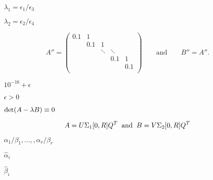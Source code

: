{\newpage\clearpage
{}%
$\lambda_1 = \epsilon_1 / \epsilon_3$%
\lthtmlinlinemathZ
\lthtmlcheckvsize\clearpage}

{\newpage\clearpage
{}%
$\lambda_2 = \epsilon_2 / \epsilon_4$%
\lthtmlinlinemathZ
\lthtmlcheckvsize\clearpage}

{\newpage\clearpage
{}%
\begin{displaymath}
A'' = \left( \begin{array}{ccccc}
           0.1 & 1   &        &        &     \\
               & 0.1 & 1      &        &     \\
               &     & \ddots & \ddots &      \\
               &     &        & 0.1    &  1   \\
               &     &        &        & 0.1   \\
           \end{array} \right) \quad\quad
\mbox{and} \quad\quad B'' = A''.
\end{displaymath}%
\lthtmldisplayZ
\lthtmlcheckvsize\clearpage}

{\newpage\clearpage
{}%
$10^{-16} + \epsilon$%
\lthtmlinlinemathZ
\lthtmlcheckvsize\clearpage}

{\newpage\clearpage
{}%
$\epsilon>0$%
\lthtmlinlinemathZ
\lthtmlcheckvsize\clearpage}

{\newpage\clearpage
{}%
${\rm det}(A- \lambda B) \equiv 0$%
\lthtmlinlinemathZ
\lthtmlcheckvsize\clearpage}

{\newpage\clearpage
{}%
\begin{displaymath}
A = U \Sigma_1 [0,R] Q^T \; \; {\rm and} \; \;
B = V \Sigma_2 [0,R] Q^T
\end{displaymath}%
\lthtmldisplayZ
\lthtmlcheckvsize\clearpage}

{\newpage\clearpage
{}%
$\alpha_1 / \beta_1 , \ldots,,  \alpha_r / \beta_r$%
\lthtmlinlinemathZ
\lthtmlcheckvsize\clearpage}

{\newpage\clearpage
{}%
$\hat{\alpha}_i$%
\lthtmlinlinemathZ
\lthtmlcheckvsize\clearpage}

{\newpage\clearpage
{}%
$\hat{\beta}_i$%
\lthtmlinlinemathZ
\lthtmlcheckvsize\clearpage}

